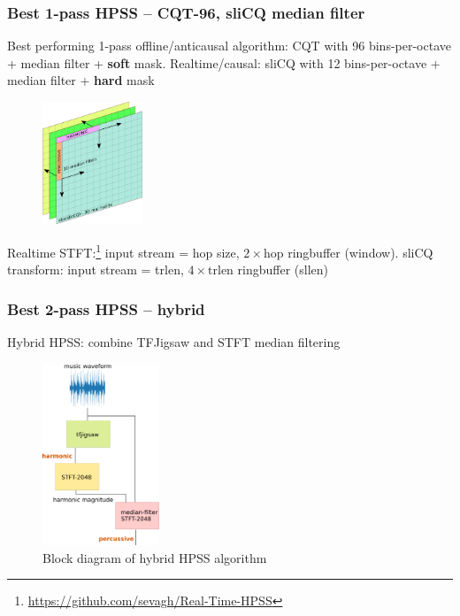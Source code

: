 \documentclass{beamer}
\begin{document}
\begin{frame}
	\frametitle{Best 1-pass HPSS -- CQT-96, sliCQ median filter}
	Best performing 1-pass offline/anticausal algorithm: CQT with 96 bins-per-octave + median filter + \textbf{soft} mask. Realtime/causal: sliCQ with 12 bins-per-octave + median filter + \textbf{hard} mask\\
	\begin{figure}[ht]
		\vspace{-0.5em}
		\includegraphics[width=3cm]{./singlemfilt3.png}
		\vspace{-0.75em}
	\end{figure}
	Realtime STFT:\footnote{\url{https://github.com/sevagh/Real-Time-HPSS}} input stream = hop size, $2 \times \text{hop}$ ringbuffer (window). sliCQ transform: input stream = trlen, $4 \times \text{trlen}$ ringbuffer (sllen)
\end{frame}



\begin{frame}
	\frametitle{Best 2-pass HPSS -- hybrid}
	Hybrid HPSS: combine TFJigsaw and STFT median filtering
	\begin{figure}[ht]
		\vspace{-0.5em}
		\includegraphics[width=3.5cm]{./hybrid_hpss_block_diagram.png}
		\caption{Block diagram of hybrid HPSS algorithm}
		\vspace{-0.75em}
	\end{figure}
\end{frame}
\end{document}
